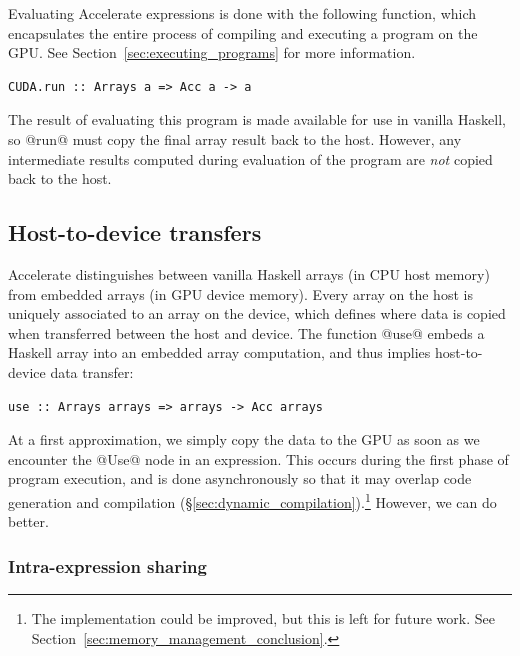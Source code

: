 Evaluating Accelerate expressions is done with the following function, which
encapsulates the entire process of compiling and executing a program on the
GPU\@. See Section~\ref{sec:executing_programs} for more information.
%
\begin{lstlisting}[style=haskell,numbers=none]
CUDA.run :: Arrays a => Acc a -> a
\end{lstlisting}
%
The result of evaluating this program is made available for use in vanilla
Haskell, so @run@ must copy the final array result back to the host.
However, any intermediate results computed during evaluation of the program are
\emph{not} copied back to the host.


\subsection{Host-to-device transfers}
\label{sec:host_device_transfers}

Accelerate distinguishes between vanilla Haskell arrays (in CPU host memory)
from embedded arrays (in GPU device memory). Every array on the host is
uniquely associated to an array on the device, which defines where data is
copied when transferred between the host and device. The function @use@ embeds a
Haskell array into an embedded array computation, and thus implies
host-to-device data transfer:
%
\begin{lstlisting}[style=haskell,numbers=none]
use :: Arrays arrays => arrays -> Acc arrays
\end{lstlisting}
%

At a first approximation, we simply copy the data to the GPU as soon as we
encounter the @Use@ node in an expression. This occurs during the first
phase of program execution, and is done asynchronously so that it may overlap
code generation and compilation (\S\ref{sec:dynamic_compilation}).\footnote{The
implementation could be improved, but this is left for future work. See
Section~\ref{sec:memory_management_conclusion}.}
However, we can do better.

\subsubsection{Intra-expression sharing}

